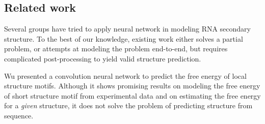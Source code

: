 \documentclass{article}
\begin{document}
\subsection{Related work}

Several groups have tried to apply neural network in modeling RNA secondary structure.
To the best of our knowledge, existing work either solves a partial problem,
or attempts at modeling the problem end-to-end,
but requires complicated post-processing to yield valid structure prediction.

Wu\cite{wu2018convolutional} presented a convolution neural network to predict the free energy of local structure motifs.
Although it shows promising results on modeling the free energy of short structure motif from experimental data
and on estimating the free energy for a \textit{given} structure,
it does not solve the problem of predicting structure from sequence.
\end{document}
